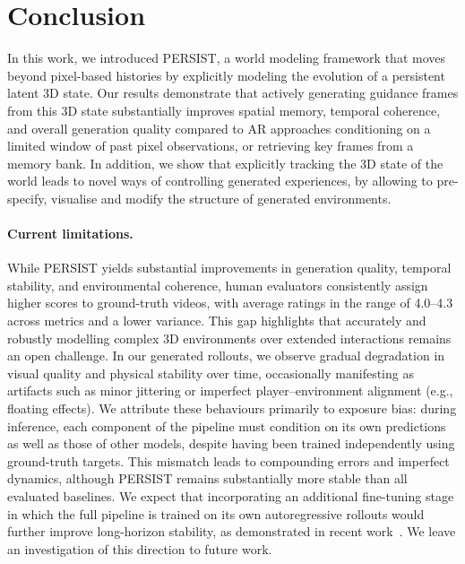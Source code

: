 \documentclass{article}
\theoremstyle{plain}
\theoremstyle{definition}
\theoremstyle{remark}
\begin{document}

\section{Conclusion}

In this work, we introduced PERSIST, a world modeling framework that moves beyond pixel-based histories by explicitly modeling the evolution of a persistent latent 3D state. Our results demonstrate that actively generating guidance frames from this 3D state substantially improves spatial memory, temporal coherence, and overall generation quality compared to AR approaches conditioning on a limited window of past pixel observations, or retrieving key frames from a memory bank. In addition, we show that explicitly tracking the 3D state of the world leads to novel ways of controlling generated experiences, by allowing to pre-specify, visualise and modify the structure of generated environments.

\paragraph{Current limitations.} While PERSIST yields substantial improvements in generation quality, temporal stability, and environmental coherence, human evaluators consistently assign higher scores to ground-truth videos, with average ratings in the range of 4.0–4.3 across metrics and a lower variance. This gap highlights that accurately and robustly modelling complex 3D environments over extended interactions remains an open challenge. In our generated rollouts, we observe gradual degradation in visual quality and physical stability over time, occasionally manifesting as artifacts such as minor jittering or imperfect player–environment alignment (e.g., floating effects). We attribute these behaviours primarily to exposure bias: during inference, each component of the pipeline must condition on its own predictions as well as those of other models, despite having been trained independently using ground-truth targets. This mismatch leads to compounding errors and imperfect dynamics, although PERSIST remains substantially more stable than all evaluated baselines. We expect that incorporating an additional fine-tuning stage in which the full pipeline is trained on its own autoregressive rollouts would further improve long-horizon stability, as demonstrated in recent work~\citep{huang2025self}. We leave an investigation of this direction to future work.
\end{document}
